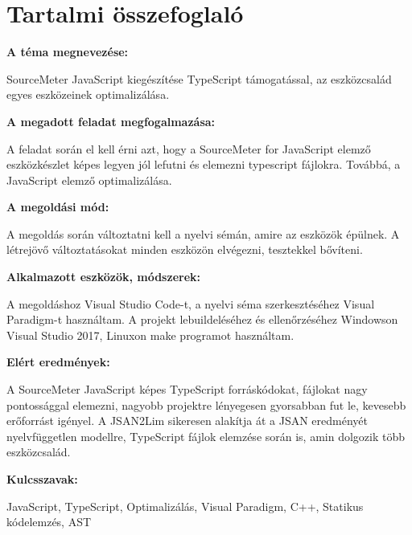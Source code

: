 \chapter*{Tartalmi összefoglaló}

\noindent\textbf{A téma megnevezése:}

SourceMeter JavaScript kiegészítése TypeScript támogatással, az eszközcsalád egyes eszközeinek optimalizálása.

\noindent\textbf{A megadott feladat megfogalmazása:}

A feladat során el kell érni azt, hogy a SourceMeter for JavaScript elemző eszközkészlet képes legyen jól lefutni és elemezni typescript fájlokra.
Továbbá, a JavaScript elemző optimalizálása.

\noindent\textbf{A megoldási mód:}

A megoldás során változtatni kell a nyelvi sémán, amire az eszközök épülnek. A létrejövő változtatásokat minden eszközön elvégezni, tesztekkel bővíteni.

\noindent\textbf{Alkalmazott eszközök, módszerek:}

A megoldáshoz Visual Studio Code-t, a nyelvi séma szerkesztéséhez Visual Paradigm-t használtam.
A projekt lebuildeléséhez és ellenőrzéséhez Windowson Visual Studio 2017, Linuxon make programot használtam.

\noindent\textbf{Elért eredmények:}

A SourceMeter JavaScript képes TypeScript forráskódokat, fájlokat nagy pontossággal elemezni, nagyobb projektre lényegesen gyorsabban fut le, kevesebb erőforrást igényel.
A JSAN2Lim sikeresen alakítja át a JSAN eredményét nyelvfüggetlen modellre, TypeScript fájlok elemzése során is, amin dolgozik több eszközcsalád.

\noindent\textbf{Kulcsszavak:}

JavaScript, TypeScript, Optimalizálás, Visual Paradigm, C++, Statikus kódelemzés, AST
